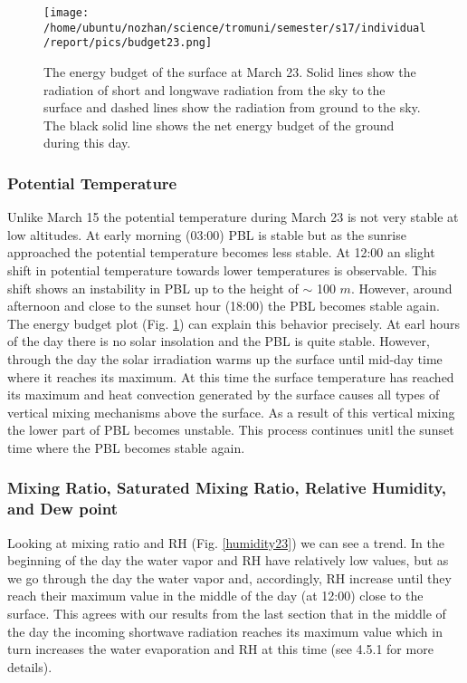 \documentclass[a4paper,12pt]{article}
\numberwithin{equation}{section} %
\begin{document}
\begin{figure}[bhp]
\texttt{[image: /home/ubuntu/nozhan/science/tromuni/semester/s17/individual/report/pics/budget23.png]}
\caption{The energy budget of the surface at March 23. Solid lines show the radiation of short and longwave radiation from the sky to the surface and dashed lines show the radiation from ground to the sky. The black solid line shows the net energy budget of the ground during this day.}
\label{budget23}
\end{figure}

\vspace{0.35cm}

\subsubsection{Potential Temperature}

Unlike March 15 the potential temperature during March 23 is not very stable at low altitudes. At early morning (03:00) PBL is stable but as the sunrise approached the potential temperature becomes less stable. At 12:00 an slight shift in potential temperature towards lower temperatures is observable. This shift shows an instability in PBL up to the height of $\sim$ 100 $m$. However, around afternoon and close to the sunset hour (18:00) the PBL becomes stable again. The energy budget plot (Fig. \ref{budget23}) can explain this behavior precisely. At earl hours of the day there is no solar insolation and the PBL is quite stable. However, through the day the solar irradiation warms up the surface until mid-day time where it reaches its maximum. At this time the surface temperature has reached its maximum and heat convection generated by the surface causes all types of vertical mixing mechanisms above the surface. As a result of this vertical mixing  the lower part of PBL becomes unstable. This process continues unitl the sunset time where the PBL becomes stable again.

\subsubsection{Mixing Ratio, Saturated Mixing Ratio, Relative Humidity, and Dew point}

Looking at mixing ratio and RH (Fig. \ref{humidity23}) we can see a trend. In the beginning of the day the water vapor and RH have relatively low values, but as we go through the day the water vapor and, accordingly, RH increase until they reach their maximum value in the middle of the day (at 12:00) close to the surface. This agrees with our results from the last section that in the middle of the day the incoming shortwave radiation reaches its maximum value which in turn increases the water evaporation and RH at this time (see 4.5.1 for more details).
\end{document}
